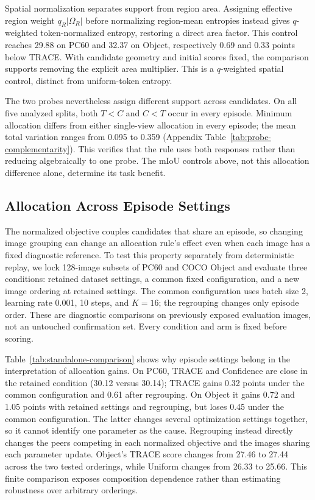 \documentclass[letterpaper]{article}
\begin{document}
Spatial normalization separates support from region area. Assigning effective region weight $q_R|\Omega_R|$ before normalizing region-mean entropies instead gives $q$-weighted token-normalized entropy, restoring a direct area factor. This control reaches 29.88 on PC60 and 32.37 on Object, respectively 0.69 and 0.33 points below TRACE. With candidate geometry and initial scores fixed, the comparison supports removing the explicit area multiplier. This is a $q$-weighted spatial control, distinct from uniform-token entropy.

The two probes nevertheless assign different support across candidates. On all five analyzed splits, both $T<C$ and $C<T$ occur in every episode. Minimum allocation differs from either single-view allocation in every episode; the mean total variation ranges from 0.095 to 0.359 (Appendix Table~\ref{tab:probe-complementarity}). This verifies that the rule uses both responses rather than reducing algebraically to one probe. The mIoU controls above, not this allocation difference alone, determine its task benefit.

\subsection{Allocation Across Episode Settings}
The normalized objective couples candidates that share an episode, so changing image grouping can change an allocation rule's effect even when each image has a fixed diagnostic reference. To test this property separately from deterministic replay, we lock 128-image subsets of PC60 and COCO Object and evaluate three conditions: retained dataset settings, a common fixed configuration, and a new image ordering at retained settings. The common configuration uses batch size 2, learning rate 0.001, 10 steps, and $K=16$; the regrouping changes only episode order. These are diagnostic comparisons on previously exposed evaluation images, not an untouched confirmation set. Every condition and arm is fixed before scoring.



Table~\ref{tab:standalone-comparison} shows why episode settings belong in the interpretation of allocation gains. On PC60, TRACE and Confidence are close in the retained condition (30.12 versus 30.14); TRACE gains 0.32 points under the common configuration and 0.61 after regrouping. On Object it gains 0.72 and 1.05 points with retained settings and regrouping, but loses 0.45 under the common configuration. The latter changes several optimization settings together, so it cannot identify one parameter as the cause. Regrouping instead directly changes the peers competing in each normalized objective and the images sharing each parameter update. Object's TRACE score changes from 27.46 to 27.44 across the two tested orderings, while Uniform changes from 26.33 to 25.66. This finite comparison exposes composition dependence rather than estimating robustness over arbitrary orderings.
\end{document}
